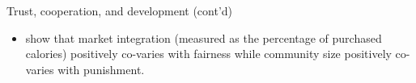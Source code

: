 \documentclass[aspectratio=169, 10pt, handout]{beamer}
\begin{document}
\begin{frame}{Trust, cooperation, and development (cont'd)}
{\begin{itemize}
\begin{itemize}
            \item The emergence of moralizing gods, for instance, was a cultural tool which helped people cooperate with strangers. The evidence is hard to evaluate, since they try to explain tens of facts rather than through any one clear test.
        \end{itemize} 
        
        \item \cite{henrich2010markets} show that market integration (measured as the percentage of purchased calories) positively co-varies with fairness while community size positively co-varies with punishment.

    \end{itemize}
}

\end{frame}
\end{document}
